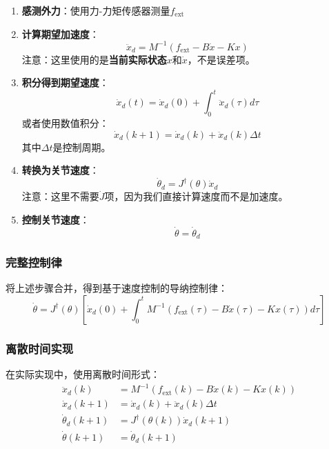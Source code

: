 \documentclass[12pt,a4paper]{article}
\begin{document}
\begin{enumerate}
\item \textbf{感测外力}：使用力-力矩传感器测量$f_{\text{ext}}$
\item \textbf{计算期望加速度}：
\begin{equation}
\ddot{x}_d = M^{-1}(f_{\text{ext}} - B\dot{x} - Kx)
\end{equation}
注意：这里使用的是\textbf{当前实际状态}$x$和$\dot{x}$，不是误差项。
\item \textbf{积分得到期望速度}：
\begin{equation}
\dot{x}_d(t) = \dot{x}_d(0) + \int_0^t \ddot{x}_d(\tau) d\tau
\end{equation}
或者使用数值积分：
\begin{equation}
\dot{x}_d(k+1) = \dot{x}_d(k) + \ddot{x}_d(k) \Delta t
\end{equation}
其中$\Delta t$是控制周期。

\item \textbf{转换为关节速度}：
\begin{equation}
\dot{\theta}_d = J^{\dagger}(\theta)\dot{x}_d
\end{equation}
注意：这里不需要$\dot{J}$项，因为我们直接计算速度而不是加速度。

\item \textbf{控制关节速度}：
\begin{equation}
\dot{\theta} = \dot{\theta}_d
\end{equation}
\end{enumerate}

\subsubsection{完整控制律}

将上述步骤合并，得到基于速度控制的导纳控制律：
\begin{equation}
\dot{\theta} = J^{\dagger}(\theta) \left[ \dot{x}_d(0) + \int_0^t M^{-1}(f_{\text{ext}}(\tau) - B\dot{x}(\tau) - Kx(\tau)) d\tau \right]
\end{equation}

\subsubsection{离散时间实现}

在实际实现中，使用离散时间形式：
\begin{align}
\ddot{x}_d(k) &= M^{-1}(f_{\text{ext}}(k) - B\dot{x}(k) - Kx(k)) \\
\dot{x}_d(k+1) &= \dot{x}_d(k) + \ddot{x}_d(k) \Delta t \\
\dot{\theta}_d(k+1) &= J^{\dagger}(\theta(k))\dot{x}_d(k+1) \\
\dot{\theta}(k+1) &= \dot{\theta}_d(k+1)
\end{align}
\end{document}
